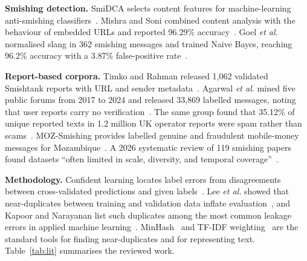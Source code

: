 \documentclass[12pt,a4paper]{report}
\begin{document}
\textbf{Smishing detection.} SmiDCA selects content features for machine-learning anti-smishing classifiers~\cite{sonowal2018smidca}. Mishra and Soni combined content analysis with the behaviour of embedded URLs and reported 96.29\% accuracy~\cite{mishra2020smishing}. Goel \textit{et al.} normalised slang in 362 smishing messages and trained Naive Bayes, reaching 96.2\% accuracy with a 3.87\% false-positive rate~\cite{goel2024ml}.

\textbf{Report-based corpora.} Timko and Rahman released 1,062 validated Smishtank reports with URL and sender metadata~\cite{timko2024smishing}. Agarwal \textit{et al.} mined five public forums from 2017 to 2024 and released 33,869 labelled messages, noting that user reports carry no verification~\cite{agarwal2025fishing}. The same group found that 35.12\% of unique reported texts in 1.2 million UK operator reports were spam rather than scams~\cite{agarwal2026overview}. MOZ-Smishing provides labelled genuine and fraudulent mobile-money messages for Mozambique~\cite{ali2025moz}. A 2026 systematic review of 119 smishing papers found datasets ``often limited in scale, diversity, and temporal coverage''~\cite{pritom2026sms}.

\textbf{Methodology.} Confident learning locates label errors from disagreements between cross-validated predictions and given labels~\cite{northcutt2021confident}. Lee \textit{et al.} showed that near-duplicates between training and validation data inflate evaluation~\cite{lee2022dedup}, and Kapoor and Narayanan list such duplicates among the most common leakage errors in applied machine learning~\cite{kapoor2023leakage}. MinHash~\cite{broder1997resemblance} and TF-IDF weighting~\cite{salton1988term} are the standard tools for finding near-duplicates and for representing text. Table~\ref{tab:lit} summarises the reviewed work.
\end{document}
